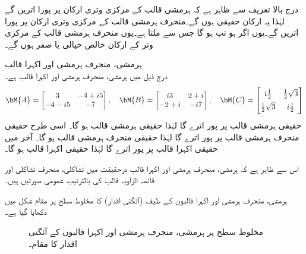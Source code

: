 درج بالا  تعریف سے ظاہر ہے کہ ہرمشی قالب کے مرکزی وتری ارکان  پر پورا اتریں گے  لہٰذا یہ ارکان حقیقی ہوں گے۔منحرف ہرمشی قالب کے مرکزی وتری  ارکان  پر پورا اتریں گے۔یوں اگر  ہو تب   ہو گا جس سے   ملتا ہے۔یوں منحرف ہرمشی قالب کے مرکزی وتر کے ارکان خالص خیالی یا صفر  ہوں گے۔

\quad ہرمشی، منحرف ہرمشی اور اکہرا قالب\\
درج ذیل میں  ہرمشی،  منحرف ہرمشی اور  اکہرا قالب ہے۔
\begin{align*}
\bM{A}=\begin{bmatrix} 3&-4+i5\\-4-i5&-7 \end{bmatrix}, \quad \bM{B}=\begin{bmatrix} i3&2+i\\-2+i&-i7 \end{bmatrix},\quad
\bM{C}=\begin{bmatrix} i\tfrac{1}{2}&\tfrac{1}{2}\sqrt{3}\\[0.5em]\tfrac{1}{2}\sqrt{3}&i\tfrac{1}{2} \end{bmatrix}  
\end{align*}
حقیقی ہرمشی قالب  پر پور اترے گا لہٰذا حقیقی ہرمشی قالب  ہو گا۔ اسی طرح حقیقی منحرف ہرمشی قالب
  پر پور اترے گا لہٰذا حقیقی منحرف ہرمشی قالب  ہو گا۔ آخر میں حقیقی اکہرا  قالب
  پر پور اترے گا لہٰذا حقیقی اکہرا قالب  ہو گا۔ 

اس سے ظاہر ہے کہ  ہرمشی،  منحرف ہرمشی اور اکہرا قالب درحقیقت میں تشاکلی، منحرف تشاکلی اور قائمہ الزاویہ قالب کی بالترتیب عمومی صورتیں ہیں۔

ہرمشی، منحرف ہرمشی اور اکہرا قالبوں کے طیف (آئگنی اقدار) کا مخلوط  سطح پر مقام شکل  میں دکھایا گیا ہے۔
\begin{figure}
\centering
{}
\caption{مخلوط  سطح پر ہرمشی، منحرف ہرمشی اور اکہرا قالبوں کے آئگنی اقدار کا مقام۔}
\label{شکل_آئگنی_مخلوط_سطح_مقام}
\end{figure}

